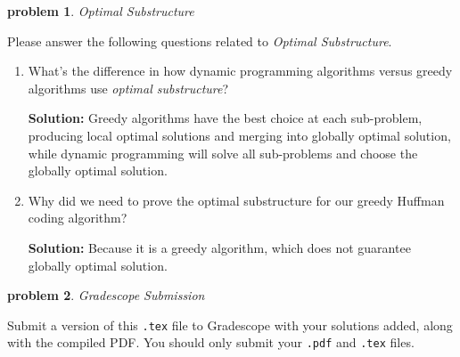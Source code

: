 \documentclass[10pt]{article}
\newcommand{\solution}[1]{\color{blue}\hfill\break\noindent\textbf{Solution:} #1\color{black}}
\newtheorem{problem}{\sc\color{cit}problem}
\begin{document}
\begin{problem}Optimal Substructure\end{problem}
Please answer the following questions related to \emph{Optimal Substructure}.

\begin{enumerate}
\renewcommand{\theenumi}{\Alph{enumi}}

    \item What's the difference in how dynamic programming algorithms versus greedy algorithms use \emph{optimal substructure}?
    
    \solution{
    Greedy algorithms have the best choice at each sub-problem, producing local optimal solutions and merging into globally optimal solution, while dynamic programming will solve all sub-problems and choose the globally optimal solution.
    }
    \item Why did we need to prove the optimal substructure for our greedy Huffman coding algorithm?

    \solution{
    Because it is a greedy algorithm, which does not guarantee globally optimal solution.
    }
\end{enumerate}

\begin{problem} Gradescope Submission \end{problem}

Submit a version of this \verb|.tex| file to Gradescope with your solutions added, along with the compiled PDF.  You should only submit your \verb|.pdf| and \verb|.tex| files.
\end{document}
